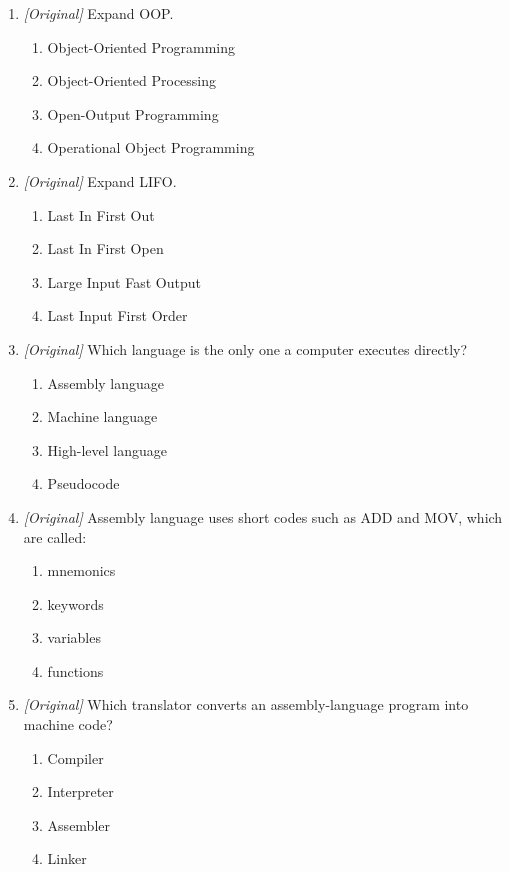\begin{enumerate}[label=\textbf{Q\arabic*.}, leftmargin=*]
\item \textit{[Original]} Expand OOP.
  \begin{enumerate}[label=\Alph*.]
    \item Object-Oriented Programming
    \item Object-Oriented Processing
    \item Open-Output Programming
    \item Operational Object Programming
  \end{enumerate}
\item \textit{[Original]} Expand LIFO.
  \begin{enumerate}[label=\Alph*.]
    \item Last In First Out
    \item Last In First Open
    \item Large Input Fast Output
    \item Last Input First Order
  \end{enumerate}
\item \textit{[Original]} Which language is the only one a computer executes
  directly?
  \begin{enumerate}[label=\Alph*.]
    \item Assembly language
    \item Machine language
    \item High-level language
    \item Pseudocode
  \end{enumerate}
\item \textit{[Original]} Assembly language uses short codes such as ADD and
  MOV, which are called:
  \begin{enumerate}[label=\Alph*.]
    \item mnemonics
    \item keywords
    \item variables
    \item functions
  \end{enumerate}
\item \textit{[Original]} Which translator converts an assembly-language
  program into machine code?
  \begin{enumerate}[label=\Alph*.]
    \item Compiler
    \item Interpreter
    \item Assembler
    \item Linker

\end{enumerate}
\end{enumerate}

